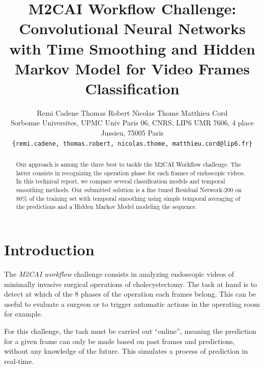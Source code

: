 \documentclass[10pt,twocolumn,letterpaper]{article}
\begin{document}
\title{M2CAI Workflow Challenge: Convolutional Neural Networks with Time Smoothing and Hidden Markov Model for Video Frames Classification}

\author{Remi Cadene \hspace{1cm} Thomas Robert \hspace{1cm} Nicolas Thome \hspace{1cm} Matthieu Cord\\
Sorbonne Universites, UPMC Univ Paris 06, CNRS, LIP6 UMR 7606, 4 place Jussieu, 75005 Paris\\
{\tt\small \{remi.cadene, thomas.robert, nicolas.thome, matthieu.cord@lip6.fr\}}
}

\maketitle

\begin{abstract}
Our approach is among the three best to tackle the M2CAI Workflow challenge. The latter consists in recognizing the operation phase for each frames of endoscopic videos. In this technical report, we compare several classification models and temporal smoothing methods. Our submitted solution is a fine tuned Residual Network-200 on 80\% of the training set with temporal smoothing using simple temporal averaging of the predictions and a Hidden Markov Model modeling the sequence.
\end{abstract}

\section{Introduction}

The \emph{M2CAI workflow} challenge \cite{twinanda2016endonet, sahu2016, dergachyova2016, jin2016} consists in analyzing endoscopic videos of
minimally invasive surgical operations of cholecystectomy. The task at hand is
to detect at which of the 8 phases of the operation each frames belong. This can
be useful to evaluate a surgeon or to trigger automatic actions in the operating
room for example.

For this challenge, the task must be carried out ``online'', meaning the prediction
for a given frame can only be made based on past frames and predictions, without
any knowledge of the future. This simulates a process of prediction in real-time.
\end{document}
